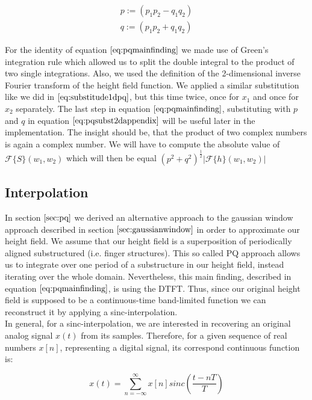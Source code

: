 \begin{align}
p := (p_1 p_2 - q_1 q_2) \nonumber \\ 
q := (p_1 p_2 + q_1 q_2)
\label{eq:pqsubst2}
\end{align}

For the identity of equation $\ref{eq:pqmainfinding}$ we made use of Green's integration rule which allowed us to split the double integral to the product of two single integrations. Also, we used the definition of the 2-dimensional inverse Fourier transform of the height field function. We applied a similar substitution like we did in $\ref{eq:substitude1dpq}$, but this time twice, once for $x_1$ and once for $x_2$ separately. The last step in equation $\ref{eq:pqmainfinding}$, substituting with $p$ and $q$ in equation $\ref{eq:pqsubst2dappendix}$ will be useful later in the implementation. The insight should be, that the product of two complex numbers is again a complex number. We will have to compute the absolute value of $\mathcal{F}\{S\}(w_1,w_2)$ which will then be equal $(p^2 + q^2)^{\frac{1}{2}}\left|\mathcal{F}\{h\}(w_1,w_2)\right|$

\subsection{Interpolation}
\label{sec:sincinterpolation}
In section $\ref{sec:pq}$ we derived an alternative approach to the gaussian window approach described in section $\ref{sec:gaussianwindow}$ in order to approximate our height field. We assume that our height field is a superposition of periodically aligned substructured (i.e. finger structures). This so called PQ approach allows us to integrate over one period of a substructure in our height field, instead iterating over the whole domain. Nevertheless, this main finding, described in equation $\ref{eq:pqmainfinding}$, is using the DTFT. Thus, since our original height field is supposed to be a continuous-time band-limited function we can reconstruct it by applying a sinc-interpolation. \\

In general, for a sinc-interpolation, we are interested in recovering an original analog signal $x(t)$ from its samples. Therefore, for a given sequence of real numbers $x[n]$, representing a digital signal, its correspond continuous function is: 

\begin{equation}
  x(t) = \sum_{n=-\infty}^{\infty} x[n] sinc\left(\frac{t-nT}{T}\right)
\end{equation}


